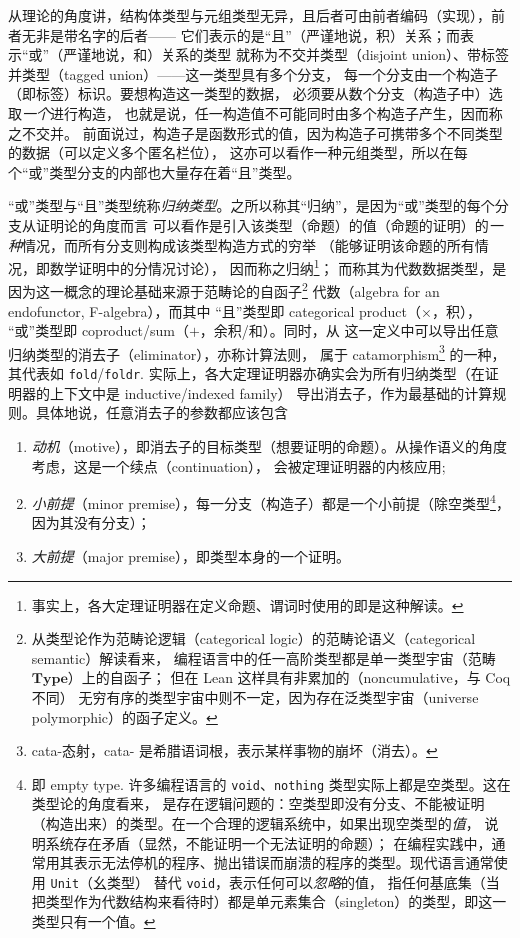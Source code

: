 从理论的角度讲，结构体类型与元组类型无异，且后者可由前者编码（实现），前者无非是带名字的后者——
它们表示的是“且”（严谨地说，积）关系；而表示“或”（严谨地说，和）关系的类型
就称为不交并类型（disjoint union）、带标签并类型（tagged union）——这一类型具有多个分支，
每一个分支由一个构造子（即标签）标识。要想构造这一类型的数据，
必须要从数个分支（构造子中）选取\emph{一个}进行构造，
也就是说，任一构造值不可能同时由多个构造子产生，因而称之不交并。
前面说过，构造子是函数形式的值，因为构造子可携带多个不同类型的数据（可以定义多个匿名栏位），
这亦可以看作一种元组类型，所以在每个“或”类型分支的内部也大量存在着“且”类型。

“或”类型与“且”类型统称\emph{归纳类型}。之所以称其“归纳”，是因为“或”类型的每个分支从证明论的角度而言
可以看作是引入该类型（命题）的值（命题的证明）的\emph{一种}情况，而所有分支则构成该类型构造方式的穷举
（能够证明该命题的所有情况，即数学证明中的分情况讨论），
因而称之归纳\footnote{
  事实上，各大定理证明器在定义命题、谓词时使用的即是这种解读。
}；
而称其为代数数据类型，是因为这一概念的理论基础来源于范畴论的自函子\footnote{
  从类型论作为范畴论逻辑（categorical logic）的范畴论语义（categorical semantic）解读看来，
  编程语言中的任一高阶类型都是单一类型宇宙（范畴 $\mathbf{Type}$）上的自函子；
  但在 Lean 这样具有非累加的（noncumulative，与 Coq 不同）
  无穷有序的类型宇宙中则不一定，因为存在泛类型宇宙（universe polymorphic）的函子定义。
}
代数（algebra for an endofunctor, F-algebra），而其中
“且”类型即 categorical product（$\times$，积），
“或”类型即 coproduct/sum（$+$，余积/和）。同时，从
这一定义中可以导出任意归纳类型的消去子（eliminator），亦称计算法则，
属于 catamorphism\footnote{
  cata-态射，cata- 是希腊语词根，表示某样事物的崩坏（消去）。
}
的一种，其代表如 \texttt{fold}/\texttt{foldr}.
实际上，各大定理证明器亦确实会为所有归纳类型（在证明器的上下文中是 inductive/indexed family）
导出消去子，作为最基础的计算规则。具体地说，任意消去子的参数都应该包含
\vspace{-.6em}
\begin{enumerate}\itemsep-.2em
  \item\emph{动机}（motive），即消去子的目标类型（想要证明的命题）。从操作语义的角度考虑，这是一个续点（continuation），
    会被定理证明器的内核应用;
  \item\emph{小前提}（minor premise），每一分支（构造子）都是一个小前提（除空类型\footnote{
      即 empty type. 许多编程语言的 \texttt{void}、\texttt{nothing} 类型实际上都是空类型。这在类型论的角度看来，
      是存在逻辑问题的：空类型即没有分支、不能被证明（构造出来）的类型。在一个合理的逻辑系统中，如果出现空类型的\emph{值}，
      说明系统存在矛盾（显然，不能证明一个无法证明的命题）；
      在编程实践中，通常用其表示无法停机的程序、抛出错误而崩溃的程序的类型。现代语言通常使用 \texttt{Unit}（幺类型）
      替代 \texttt{void}，表示任何可以\emph{忽略}的值，
      指任何基底集（当把类型作为代数结构来看待时）都是单元素集合（singleton）的类型，即这一类型只有一个值。
    }，因为其没有分支）；
  \item\emph{大前提}（major premise），即类型本身的一个证明。
\end{enumerate}
